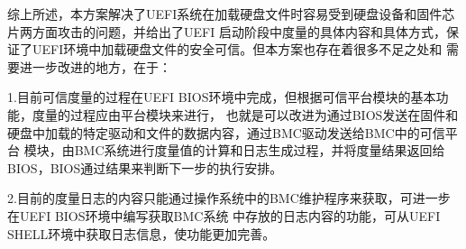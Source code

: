 \begin{APP}
\par 综上所述，本方案解决了UEFI系统在加载硬盘文件时容易受到硬盘设备和固件芯片两方面攻击的问题，并给出了UEFI
启动阶段中度量的具体内容和具体方式，保证了UEFI环境中加载硬盘文件的安全可信。但本方案也存在着很多不足之处和
需要进一步改进的地方，在于：
\par 1.目前可信度量的过程在UEFI BIOS环境中完成，但根据可信平台模块的基本功能，度量的过程应由平台模块来进行，
也就是可以改进为通过BIOS发送在固件和硬盘中加载的特定驱动和文件的数据内容，通过BMC驱动发送给BMC中的可信平台
模块，由BMC系统进行度量值的计算和日志生成过程，并将度量结果返回给BIOS，BIOS通过结果来判断下一步的执行安排。
\par 2.目前的度量日志的内容只能通过操作系统中的BMC维护程序来获取，可进一步在UEFI BIOS环境中编写获取BMC系统
中存放的日志内容的功能，可从UEFI SHELL环境中获取日志信息，使功能更加完善。

\end{APP}

